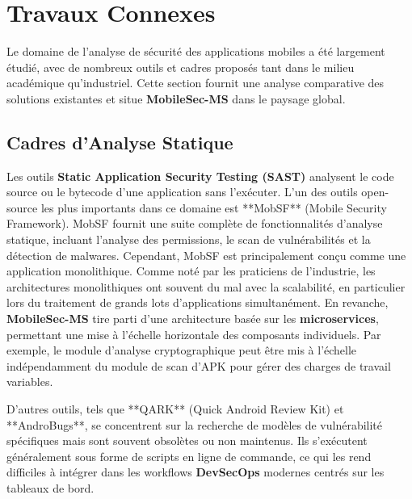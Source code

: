 \documentclass[
  journal=largetwo,
  manuscript=article-type,
  year=2025,
  volume=1,
]{cup-journal}
\begin{document}
\section{Travaux Connexes}
\label{sec:related_work}

Le domaine de l'analyse de sécurité des applications mobiles a été largement étudié, avec de nombreux outils et cadres proposés tant dans le milieu académique qu'industriel. Cette section fournit une analyse comparative des solutions existantes et situe \textbf{MobileSec-MS} dans le paysage global.

\subsection{Cadres d'Analyse Statique}
Les outils \textbf{Static Application Security Testing (SAST)} analysent le code source ou le bytecode d'une application sans l'exécuter. L'un des outils open-source les plus importants dans ce domaine est **MobSF** (Mobile Security Framework). MobSF fournit une suite complète de fonctionnalités d'analyse statique, incluant l'analyse des permissions, le scan de vulnérabilités et la détection de malwares. Cependant, MobSF est principalement conçu comme une application monolithique. Comme noté par les praticiens de l'industrie, les architectures monolithiques ont souvent du mal avec la scalabilité, en particulier lors du traitement de grands lots d'applications simultanément. En revanche, \textbf{MobileSec-MS} tire parti d'une architecture basée sur les \textbf{microservices}, permettant une mise à l'échelle horizontale des composants individuels. Par exemple, le module d'analyse cryptographique peut être mis à l'échelle indépendamment du module de scan d'APK pour gérer des charges de travail variables.

D'autres outils, tels que **QARK** (Quick Android Review Kit) et **AndroBugs**, se concentrent sur la recherche de modèles de vulnérabilité spécifiques mais sont souvent obsolètes ou non maintenus. Ils s'exécutent généralement sous forme de scripts en ligne de commande, ce qui les rend difficiles à intégrer dans les workflows \textbf{DevSecOps} modernes centrés sur les tableaux de bord.
\end{document}
